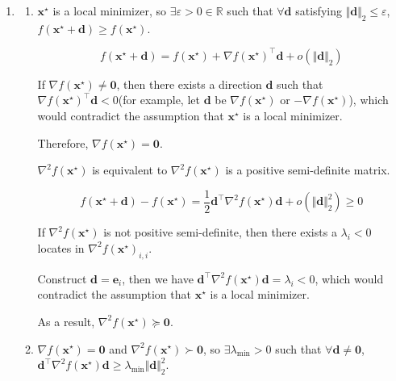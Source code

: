 \documentclass[10pt,a4paper]{article}
\begin{document}
\begin{enumerate}
\begin{enumerate}
        $$
        \frac{f(\mathbf{x} + t\mathbf{d}) - f(\mathbf{x} - t\mathbf{d})}{2t} = \nabla f(\mathbf{x})^\top \mathbf{d} + O(t^2) \quad \text{as } t \to 0
        $$
    \end{enumerate}
    
    \item[2. ]
    \begin{enumerate}
        \item[(a)]
        
        $\mathbf{x}^\star$ is a local minimizer, so $\exists \varepsilon > 0 \in \mathbb{R}$ such that $\forall \mathbf{d}$ satisfying $\Vert \mathbf{d} \Vert_2 \leq \varepsilon$, $f(\mathbf{x}^\star + \mathbf{d}) \geq f(\mathbf{x}^\star)$.
    
        $$
        f(\mathbf{x}^\star + \mathbf{d}) = f(\mathbf{x}^\star) + \nabla f(\mathbf{x}^\star)^\top \mathbf{d} + o(\Vert \mathbf{d} \Vert_2)
        $$

        If $\nabla f(\mathbf{x}^\star) \neq \mathbf{0}$, then there exists a direction $\mathbf{d}$ such that $\nabla f(\mathbf{x}^\star)^\top \mathbf{d} < 0$(for example, let $\mathbf{d}$ be $\nabla f(\mathbf{x}^\star)$ or $-\nabla f(\mathbf{x}^\star)$), which would contradict the assumption that $\mathbf{x}^\star$ is a local minimizer.

        Therefore, $\nabla f(\mathbf{x}^\star) = \mathbf{0}$.

        $\nabla^2 f(\mathbf{x}^\star)$ is equivalent to $\nabla^2 f(\mathbf{x}^\star)$ is a positive semi-definite matrix.

        $$
        f(\mathbf{x}^\star + \mathbf{d}) - f(\mathbf{x}^\star)
        = \frac12 \mathbf{d}^\top \nabla^2 f(\mathbf{x}^\star) \mathbf{d} + o(\Vert \mathbf{d} \Vert_2^2)
        \geq 0
        $$

        If $\nabla^2 f(\mathbf{x}^\star)$ is not positive semi-definite, then there exists a $\lambda_i < 0$ locates in $\nabla^2 f(\mathbf{x}^\star)_{i, i}$.
        
        Construct $\mathbf{d} = \mathbf{e}_i$, then we have $\mathbf{d}^\top \nabla^2 f(\mathbf{x}^\star) \mathbf{d} = \lambda_i < 0$, which would contradict the assumption that $\mathbf{x}^\star$ is a local minimizer.

        As a result, $\nabla^2 f(\mathbf{x}^\star) \succeq \mathbf{0}$.
    
        \item[(b)]
        
        $\nabla f(\mathbf{x}^\star) = \mathbf{0}$ and $\nabla^2 f(\mathbf{x}^\star) \succ \mathbf{0}$, so $\exists \lambda_{\min} > 0$ such that $\forall \mathbf{d} \neq \mathbf{0}$, $\mathbf{d}^\top \nabla^2 f(\mathbf{x}^\star) \mathbf{d} \geq \lambda_{\min} \Vert \mathbf{d} \Vert_2^2$.


\end{enumerate}
\end{enumerate}
\end{document}
